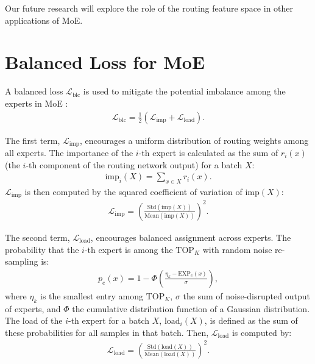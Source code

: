 \documentclass[10pt,twocolumn,letterpaper]{article}
\begin{document}
Our future research will explore the role of the routing feature space in other applications of MoE.

{
    \small
    
    
}

\clearpage
\setcounter{page}{1}
\maketitlesupplementary

\section{Balanced Loss for MoE} \label{sec:loss}

A balanced loss $\mathcal{L}_{\text{blc}}$ is used to mitigate the potential imbalance among the experts in MoE \cite{shazeer2017outrageously, mustafa2022multimodal, li2023sparse}:
\begin{align}
    \mathcal{L}_{\text {blc}} = \frac{1}{2} (\mathcal{L}_{\text{imp}}  + \mathcal{L}_{\text{load}} ).
\end{align}

The first term, $\mathcal{L}_{\text{imp}}$, encourages a uniform distribution of routing weights among all experts. The importance of the $i$-th expert is calculated as the sum of $r_i(x)$ (the $i$-th component of the routing network output) for a batch $X$:
\begin{align}
\label{eq:importance}
    \text{imp}_i(X)= \sum\limits_{x \in X} r_i(x).
\end{align}
$\mathcal{L}_{\text{imp}}$ is then computed by the squared coefficient of variation of $\text{imp}(X)$:
\begin{align}
   \mathcal{L}_{\text{imp}} = \left(\frac{\text{Std}(\text{imp}(X))}{\text{Mean}(\text{imp}(X))}\right)^{2}.
\end{align}

The second term, $\mathcal{L}_{\text{load}}$, encourages balanced assignment across experts. The probability that the $i$-th expert is among the $\text{TOP}_K$ with random noise re-sampling is:
\begin{align}
    p_{e}(x) = 1 - \Phi\left(\frac{\eta_k - \text{EXP}_{e}({x})}{\sigma}\right), \label{eq:load_prob}
\end{align}
where $\eta_{k}$ is the smallest entry among $\text{TOP}_K$, $\sigma$ the sum of noise-disrupted output of experts, and $\Phi$ the cumulative distribution function of a Gaussian distribution. The load of the $i$-th expert for a batch $X$, $\text{load}_i(X)$, is defined as the sum of these probabilities for all samples in that batch. Then, $\mathcal{L}_{\text{load}}$ is computed by:
\begin{align}
   \mathcal{L}_{\text{load}} = \left(\frac{\text{Std} (\text{load}(X))}{\text{Mean} (\text{load}(X))}\right)^{2}.
\end{align}
\end{document}
